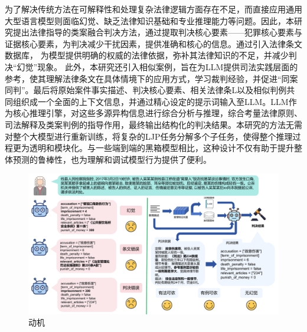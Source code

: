 为了解决传统方法在可解释性和处理复杂法律逻辑方面存在不足，而直接应用通用大型语言模型则面临幻觉、缺乏法律知识基础和专业推理能力等问题。因此，本研究提出法律指导的类案融合判决方法，通过提取判决核心要素——犯罪核心要素与证据核心要素，为判决减少干扰因素，提供准确和核心的信息。通过引入法律条文数据库， 为模型提供明确的权威的法律依据，弥补其法律知识的不足，并减少判决“幻觉”现象。 此外，本研究还引入相似案例，旨在为LLM提供司法实践层面的参考，使其理解法律条文在具体情境下的应用方式，学习裁判经验，并促进“同案同判”。最后将原始案件事实描述、判决核心要素、相关法律条L以及相似判例共同组织成一个全面的上下文信息，并通过精心设定的提示词输入至LLM。LLM作为核心推理引擎，对这些多源异构信息进行综合分析与推理，综合考量法律原则、司法解释及类案判例的指导作用，最终输出结构化的判决结果。本研究的方法无需对整个大模型进行重新训练，将复杂的LJP任务分解多个子任务，使得整个推理过程更为透明和模块化。与一些端到端的黑箱模型相比，这种设计不仅有助于提升整体预测的鲁棒性，也为理解和调试模型行为提供了便利。

\begin{figure}[H]
	\centering
	\includegraphics[width=1\linewidth]{fig/motivation.pdf}
	\caption{动机}
	\label{fig:motivation}
\end{figure}